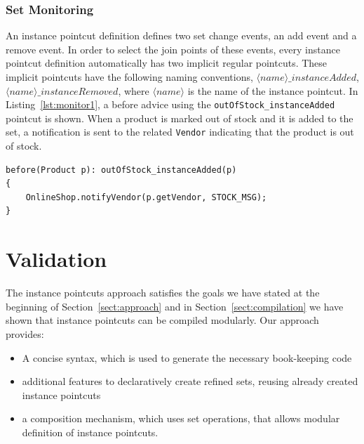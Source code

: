 \documentclass[10pt]{sigplanconf}
\newcommand{\lstinln}[1]{\lstinline~#1~}
\begin{document}
\subsubsection{Set Monitoring}
\label{sec:set-monitoring}
An instance pointcut definition defines two set change events, an add event and a remove event. In order to select the join points of these events, every instance pointcut definition automatically has two implicit regular pointcuts. These implicit pointcuts have the following naming conventions, $\langle name \rangle\_instanceAdded$, $\langle name \rangle\_instanceRemoved$, where $\langle name \rangle$ is the name of the instance pointcut. In Listing~\ref{lst:monitor1}, a before advice using the \lstinln{outOfStock_instanceAdded} pointcut is shown.
When a product is marked out of stock and it is added to the set, a notification is sent to the related \lstinln{Vendor} indicating that the product is out of stock.

\begin{lstlisting}[float=h!, caption={Set monitoring pointcut used to notify vendors}, label={lst:monitor1}]
before(Product p): outOfStock_instanceAdded(p)
{
	OnlineShop.notifyVendor(p.getVendor, STOCK_MSG);
}
\end{lstlisting}




\section{Validation}
\label{sect:checking}
The instance pointcuts approach satisfies the goals we have stated at the beginning of Section~\ref{sect:approach} and in Section~\ref{sect:compilation} we have shown that instance pointcuts can be compiled modularly.
Our approach provides:

\begin{itemize}
\item A concise syntax, which is used to generate the necessary book-keeping code
\item additional features to declaratively create refined sets, reusing already created instance pointcuts
\item a composition mechanism, which uses set operations, that allows modular definition of instance pointcuts.
\end{itemize}
\end{document}
